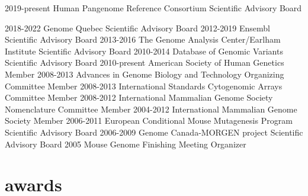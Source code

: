\documentclass[]{dmc-cv} %
\begin{document}
\begin{entrylist}
\smallentry
{2019-present}
{Human Pangenome Reference Consortium}
{Scientific Advisory Board}

\smallentry
{2018-2022}
{Genome Quebec}
{Scientific Advisory Board}
\smallentry
{2012-2019}
{Ensembl}
{Scientific Advisory Board}
\smallentry
{2013-2016}
{The Genome Analysis Center/Earlham Institute}
{Scientific Advisory Board}
\smallentry
{2010-2014}
{Database of Genomic Variants}
{Scientific Advisory Board}
\smallentry
{2010-present}
{American Society of Human Genetics}
{Member}
\smallentry
{2008-2013}
{Advances in Genome Biology and Technology}
{Organizing Committee Member}
\smallentry
{2008-2013}
{International Standards Cytogenomic Arrays}
{Committee Member}
\smallentry
{2008-2012}
{International Mammalian Genome Society}
{Nomenclature Committee Member}
\smallentry
{2004-2012}
{International Mammalian Genome Society}
{Member}
\smallentry
{2006-2011}
{European Conditional Mouse Mutagenesis Program}
{Scientific Advisory Board}
\smallentry
{2006-2009}
{Genome Canada-MORGEN project}
{Scientific Advisory Board}
\smallentry
{2005}
{Mouse Genome Finishing Meeting}
{Organizer}
\end{entrylist}


\section{awards}
\end{document}
